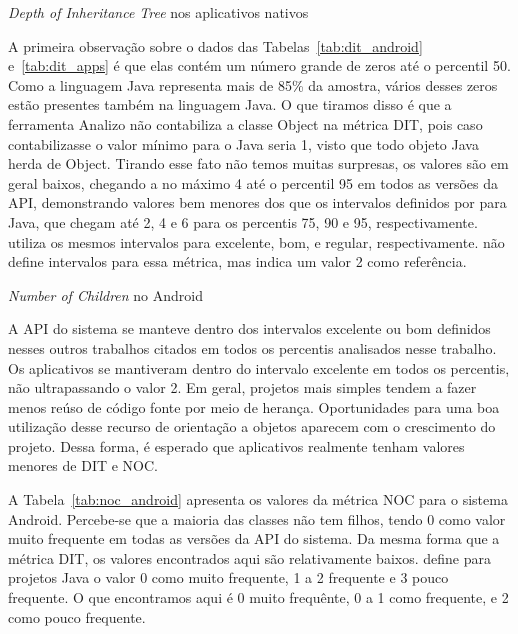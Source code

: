 \begin{table}[!htb]
\centering
{}

\caption{\textit{Depth of Inheritance Tree} nos aplicativos nativos}
\label{tab:dit_apps}
\end{table}

A primeira observação sobre o dados das Tabelas~\ref{tab:dit_android} e~\ref{tab:dit_apps} é que elas contém um número grande de zeros até o percentil 50. Como a linguagem Java representa mais de 85\% da amostra, vários desses zeros estão presentes também na linguagem Java. O que tiramos disso é que a ferramenta Analizo não contabiliza a classe Object na métrica DIT, pois caso contabilizasse o valor mínimo para o Java seria 1, visto que todo objeto Java herda de Object. Tirando esse fato não temos muitas surpresas, os valores são em geral baixos, chegando a no máximo 4 até o percentil 95 em todos as versões da API, demonstrando valores bem menores dos que os intervalos definidos por  para Java, que chegam até 2, 4 e 6 para os percentis 75, 90 e 95, respectivamente.  utiliza os mesmos intervalos para excelente, bom, e regular, respectivamente.  não define intervalos para essa métrica, mas indica um valor 2 como referência. 

\begin{table}[!htb]
\centering
{}

\caption{\textit{Number of Children} no Android}
\label{tab:noc_android}
\end{table}

A API do sistema se manteve dentro dos intervalos excelente ou bom definidos nesses outros trabalhos citados em todos os percentis analisados nesse trabalho. Os aplicativos se mantiveram dentro do intervalo excelente em todos os percentis, não ultrapassando o valor 2. Em geral, projetos mais simples tendem a fazer menos reúso de código fonte por meio de herança. Oportunidades para uma boa utilização desse recurso de orientação a objetos aparecem com o crescimento do projeto. Dessa forma, é esperado que aplicativos realmente tenham valores menores de DIT e NOC.

A Tabela~\ref{tab:noc_android} apresenta os valores da métrica NOC para o sistema Android. Percebe-se que a maioria das classes não tem filhos, tendo 0 como valor muito frequente em todas as versões da API do sistema. Da mesma forma que a métrica DIT, os valores encontrados aqui são relativamente baixos.  define para projetos Java o valor 0 como muito frequente, 1 a 2 frequente e 3 pouco frequente. O que encontramos aqui é 0 muito frequênte, 0 a 1 como frequente, e 2 como pouco frequente.

